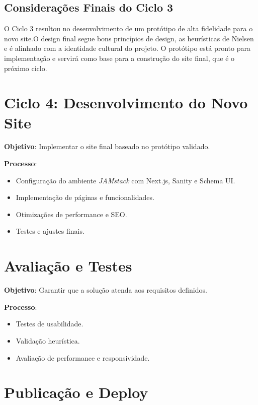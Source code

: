 \subsection{Considerações Finais do Ciclo 3}
O Ciclo 3 resultou no desenvolvimento de um protótipo de alta fidelidade para o novo site.O design final segue bons princípios de design, as heurísticas de Nielsen e é alinhado com a identidade cultural do projeto. O protótipo está pronto para implementação e servirá como base para a construção do site final, que é o próximo ciclo. 

\section{Ciclo 4: Desenvolvimento do Novo Site}
\label{sec:ciclo4_desenvolvimento}

\textbf{Objetivo}: Implementar o site final baseado no protótipo validado.

\textbf{Processo}:
\begin{itemize}
    \item Configuração do ambiente \textit{JAMstack} com Next.js, Sanity e Schema UI.
    \item Implementação de páginas e funcionalidades.
    \item Otimizações de performance e SEO.
    \item Testes e ajustes finais.
\end{itemize}

\section{Avaliação e Testes}
\label{sec:avaliacao_testes}

\textbf{Objetivo}: Garantir que a solução atenda aos requisitos definidos.

\textbf{Processo}:
\begin{itemize}
    \item Testes de usabilidade.
    \item Validação heurística.
    \item Avaliação de performance e responsividade.
\end{itemize}

\section{Publicação e Deploy}
\label{sec:publicacao_deploy}

